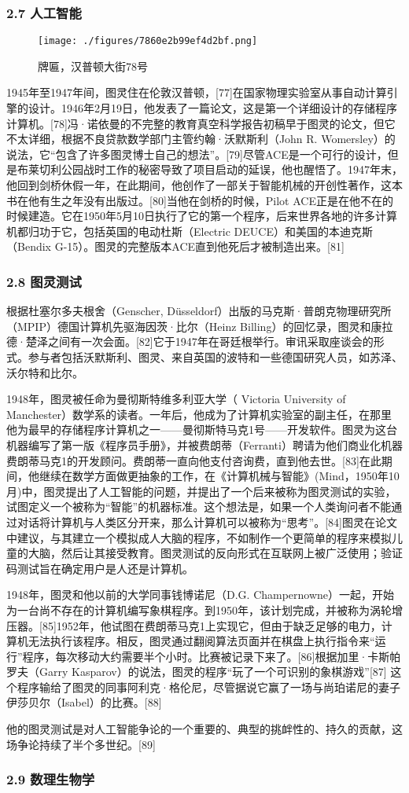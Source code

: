 \subsubsection{2.7 人工智能}
\begin{figure}[ht]
\centering
\texttt{[image: ./figures/7860e2b99ef4d2bf.png]}
\caption{牌匾，汉普顿大街78号} \label{fig_ALTL_5}
\end{figure}
1945年至1947年间，图灵住在伦敦汉普顿，[77]在国家物理实验室从事自动计算引擎的设计。1946年2月19日，他发表了一篇论文，这是第一个详细设计的存储程序计算机。[78]冯·诺依曼的不完整的教育真空科学报告初稿早于图灵的论文，但它不太详细，根据不良贷款数学部门主管约翰·沃默斯利（John R. Womersley）的说法，它“包含了许多图灵博士自己的想法”。[79]尽管ACE是一个可行的设计，但是布莱切利公园战时工作的秘密导致了项目启动的延误，他也醒悟了。1947年末，他回到剑桥休假一年，在此期间，他创作了一部关于智能机械的开创性著作，这本书在他有生之年没有出版过。[80]当他在剑桥的时候，Pilot ACE正是在他不在的时候建造。它在1950年5月10日执行了它的第一个程序，后来世界各地的许多计算机都归功于它，包括英国的电动杜斯（Electric DEUCE）和美国的本迪克斯（Bendix G-15）。图灵的完整版本ACE直到他死后才被制造出来。[81]
\subsubsection{2.8 图灵测试}
根据杜塞尔多夫根舍（Genscher, Düsseldorf）出版的马克斯·普朗克物理研究所（MPIP）德国计算机先驱海因茨·比尔（Heinz Billing）的回忆录，图灵和康拉德·楚泽之间有一次会面。[82]它于1947年在哥廷根举行。审讯采取座谈会的形式。参与者包括沃默斯利、图灵、来自英国的波特和一些德国研究人员，如苏泽、沃尔特和比尔。

1948年，图灵被任命为曼彻斯特维多利亚大学（ Victoria University of Manchester）数学系的读者。一年后，他成为了计算机实验室的副主任，在那里他为最早的存储程序计算机之一——曼彻斯特马克1号——开发软件。图灵为这台机器编写了第一版《程序员手册》，并被费朗蒂（Ferranti）聘请为他们商业化机器费朗蒂马克1的开发顾问。费朗蒂一直向他支付咨询费，直到他去世。[83]在此期间，他继续在数学方面做更抽象的工作，在《计算机械与智能》(Mind，1950年10月)中，图灵提出了人工智能的问题，并提出了一个后来被称为图灵测试的实验，试图定义一个被称为“智能”的机器标准。这个想法是，如果一个人类询问者不能通过对话将计算机与人类区分开来，那么计算机可以被称为“思考”。[84]图灵在论文中建议，与其建立一个模拟成人大脑的程序，不如制作一个更简单的程序来模拟儿童的大脑，然后让其接受教育。图灵测试的反向形式在互联网上被广泛使用；验证码测试旨在确定用户是人还是计算机。

1948年，图灵和他以前的大学同事钱博诺尼（D.G. Champernowne）一起，开始为一台尚不存在的计算机编写象棋程序。到1950年，该计划完成，并被称为涡轮增压器。[85]1952年，他试图在费朗蒂马克1上实现它，但由于缺乏足够的电力，计算机无法执行该程序。相反，图灵通过翻阅算法页面并在棋盘上执行指令来“运行”程序，每次移动大约需要半个小时。比赛被记录下来了。[86]根据加里·卡斯帕罗夫（Garry Kasparov）的说法，图灵的程序“玩了一个可识别的象棋游戏”[87] 这个程序输给了图灵的同事阿利克·格伦尼，尽管据说它赢了一场与尚珀诺尼的妻子伊莎贝尔（Isabel）的比赛。[88]

他的图灵测试是对人工智能争论的一个重要的、典型的挑衅性的、持久的贡献，这场争论持续了半个多世纪。[89]
\subsubsection{2.9 数理生物学}
